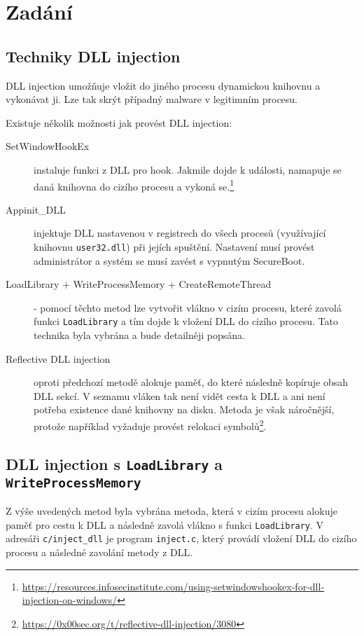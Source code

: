 \documentclass[12pt,a4paper]{article}
\begin{document}


\section{Zadání}
\subsection{Techniky DLL injection}
DLL injection umožňuje vložit do jiného procesu dynamickou knihovnu a vykonávat ji.
Lze tak skrýt případný malware v legitimním procesu.

Existuje několik možnosti jak provést DLL injection:
\begin{description}
\item[SetWindowHookEx] instaluje funkci z DLL pro hook. Jakmile dojde k události, namapuje se daná knihovna do cizího procesu a vykoná se.\footnote{\url{https://resources.infosecinstitute.com/using-setwindowshookex-for-dll-injection-on-windows/}}
	
\item[Appinit\_DLL] injektuje DLL nastavenou v registrech do všech procesů (využívající knihovnu \texttt{user32.dll}) při jejích spuštění. 
Nastavení musí provést administrátor a systém se musí zavést s vypnutým SecureBoot.

\item[LoadLibrary + WriteProcessMemory + CreateRemoteThread] - pomocí těchto metod lze vytvořit vlákno v cizím procesu, které zavolá funkci \texttt{LoadLibrary} a tím dojde k vložení DLL do cizího procesu. Tato technika byla vybrána a bude detailněji popsána.

\item[Reflective DLL injection] oproti předchozí metodě alokuje paměť, do které následně kopíruje obsah DLL sekcí.
V seznamu vláken tak není vidět cesta k DLL a ani není potřeba existence dané knihovny na disku.
Metoda je však náročnější, protože například vyžaduje provést relokaci symbolů\footnote{\url{https://0x00sec.org/t/reflective-dll-injection/3080}}.
\end{description}

\subsection{DLL injection s \texttt{LoadLibrary} a \texttt{WriteProcessMemory}}
Z výše uvedených metod byla vybrána metoda, která v cizím procesu alokuje paměť pro cestu k DLL a následně zavolá vlákno s funkci \texttt{LoadLibrary}.
V adresáři \texttt{c/inject\_dll} je program \texttt{inject.c}, který provádí vložení DLL do cizího procesu a následné zavolání metody z DLL.
\end{document}
